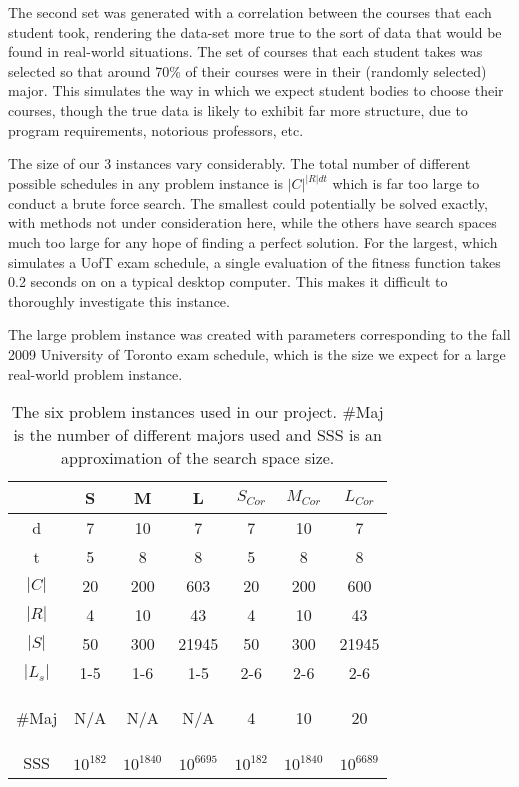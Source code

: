 \documentclass[letterpaper]{article}
\begin{document}
    The second set was generated with a correlation between the courses that each 
    student took, rendering the data-set more true to the sort of data that would 
    be found in real-world situations. The set of courses that each student takes 
    was selected so that around 70\% of their courses were in their (randomly selected) 
    major. This simulates the way in which we expect student bodies to choose their 
    courses, though the true data is likely to exhibit far more structure, due to 
    program requirements, notorious professors, etc.
      
    The size of our 3 instances vary considerably. The total number of different possible
    schedules in any problem instance is $|C|^{|R|dt}$ which is far too large to conduct
    a brute force search. The smallest could potentially be solved exactly, with methods
    not under consideration here, while the others have search spaces much too large 
    for any hope of finding a perfect solution. For the largest, which simulates a UofT 
    exam schedule, a single evaluation of the fitness function takes 0.2 seconds on on 
    a typical desktop computer. This makes it difficult to thoroughly investigate this 
    instance.
    
    The large problem instance was created with parameters corresponding to the fall 2009 
	University of Toronto exam schedule, which is the size we expect for a large 
	real-world problem instance.
	
    \begin{table}[h]
    \begin{small}
    \begin{tabular}{*{7}{c}}
    \hline 
 	  	& S 	& M 	& L 	& $S_{Cor}$ & $M_{Cor}$ & $L_{Cor}$ \\ 
    \hline \hline
     d 		& 7 	& 10	& 7 	& 7 	& 10 	& 7 	\\ 
     t 		& 5		& 8 	& 8 	& 5 	& 8 	& 8 	\\ 
     $|C|$	& 20 	& 200 	& 603 	& 20 	& 200 	& 600 	\\ 
     $|R|$	& 4 	& 10 	& 43 	& 4 	& 10 	& 43	\\ 
     $|S|$	& 50 	& 300 	& 21945 & 50 	& 300 	& 21945	\\ 
     $|L_s|$	& 1-5 	& 1-6 	& 1-5 	& 2-6 	& 2-6 	& 2-6 	\\ 
     \begin{tiny}$\#$Maj\end{tiny}	& N/A 	& N/A 	& N/A 	& 4 	& 10 	& 20 	\\ 
     \textsc{SSS}	& $10^{182}$ & $10^{1840}$ & $10^{6695}$ & $10^{182}$ & $10^{1840}$ & $10^{6689}$ \\
    \hline  
    \end{tabular} 
	\end{small}
	\caption{The six problem instances used in our project. $\#$Maj is the number of different 
	         majors used and \textsc{SSS} is an approximation of the search space size.}
	\end{table}
	
\end{document}
